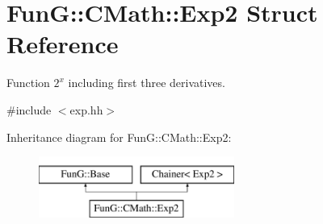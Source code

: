 \hypertarget{structFunG_1_1CMath_1_1Exp2}{\section{Fun\-G\-:\-:C\-Math\-:\-:Exp2 Struct Reference}
\label{structFunG_1_1CMath_1_1Exp2}
}


Function $2^x$ including first three derivatives.  




{\ttfamily \#include $<$exp.\-hh$>$}

Inheritance diagram for Fun\-G\-:\-:C\-Math\-:\-:Exp2\-:\begin{figure}[H]
\begin{center}
\leavevmode
\includegraphics[height=2.000000cm]{structFunG_1_1CMath_1_1Exp2}
\end{center}
\end{figure}
